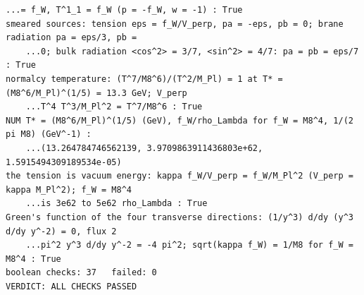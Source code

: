 \documentclass[10pt,a4paper]{article}
\begin{document}
\begin{Verbatim}[fontsize=\small,frame=single,framesep=2mm]
    ...= f_W, T^1_1 = f_W (p = -f_W, w = -1) : True
smeared sources: tension eps = f_W/V_perp, pa = -eps, pb = 0; brane radiation pa = eps/3, pb =
    ...0; bulk radiation <cos^2> = 3/7, <sin^2> = 4/7: pa = pb = eps/7 : True
normalcy temperature: (T^7/M8^6)/(T^2/M_Pl) = 1 at T* = (M8^6/M_Pl)^(1/5) = 13.3 GeV; V_perp
    ...T^4 T^3/M_Pl^2 = T^7/M8^6 : True
NUM T* = (M8^6/M_Pl)^(1/5) (GeV), f_W/rho_Lambda for f_W = M8^4, 1/(2 pi M8) (GeV^-1) :
    ...(13.264784746562139, 3.9709863911436803e+62, 1.5915494309189534e-05)
the tension is vacuum energy: kappa f_W/V_perp = f_W/M_Pl^2 (V_perp = kappa M_Pl^2); f_W = M8^4
    ...is 3e62 to 5e62 rho_Lambda : True
Green's function of the four transverse directions: (1/y^3) d/dy (y^3 d/dy y^-2) = 0, flux 2
    ...pi^2 y^3 d/dy y^-2 = -4 pi^2; sqrt(kappa f_W) = 1/M8 for f_W = M8^4 : True
boolean checks: 37   failed: 0
VERDICT: ALL CHECKS PASSED
\end{Verbatim}
\end{document}

